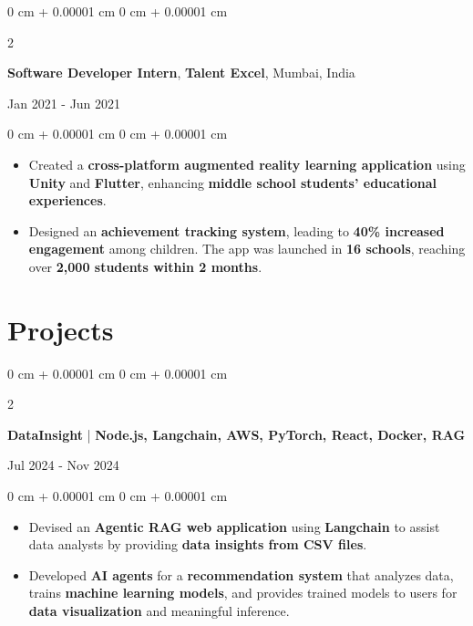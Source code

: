 \documentclass[10pt, letterpaper]{article}
\newenvironment{highlights}{
    \begin{itemize}[
        topsep=0.10 cm,
        parsep=0.10 cm,
        partopsep=0pt,
        itemsep=0pt,
        leftmargin=0 cm + 10pt
    ]
}{
    \end{itemize}
} %
\newenvironment{onecolentry}{
    \begin{adjustwidth}{
        0 cm + 0.00001 cm
    }{
        0 cm + 0.00001 cm
    }
}{
    \end{adjustwidth}
} %
\newenvironment{twocolentry}[2][]{
    \onecolentry
    \def\secondColumn{#2}
    \setcolumnwidth{\fill, 4.5 cm}
    \begin{paracol}{2}
}{
    \switchcolumn \raggedleft \secondColumn
    \end{paracol}
    \endonecolentry
} %
\begin{document}
    

    \vspace{0.10 cm}
    \begin{twocolentry}{
        Jan 2021 - Jun 2021
    }
        \textbf{Software Developer Intern}, \textbf{Talent Excel}, Mumbai, India
    \end{twocolentry}
    
    \begin{onecolentry}
        \begin{highlights}
            \item Created a \textbf{cross-platform augmented reality learning application} using \textbf{Unity} and \textbf{Flutter}, enhancing \textbf{middle school students’ educational experiences}.
            \item Designed an \textbf{achievement tracking system}, leading to \textbf{40\% increased engagement} among children. The app was launched in \textbf{16 schools}, reaching over \textbf{2,000 students within 2 months}.
        \end{highlights}
    \end{onecolentry}
    
    

        \vspace{0.2 cm}

        
        \section{Projects}

        \begin{twocolentry}{
            Jul 2024 - Nov 2024
        }
            \textbf{DataInsight} | \textbf{Node.js, Langchain, AWS, PyTorch, React, Docker, RAG}
        \end{twocolentry}
        \begin{onecolentry}
            \begin{highlights}
                \item Devised an \textbf{Agentic RAG web application} using \textbf{Langchain} to assist data analysts by providing \textbf{data insights from CSV files}.
                \item Developed \textbf{AI agents} for a \textbf{recommendation system} that analyzes data, trains \textbf{machine learning models}, and provides trained models to users for \textbf{data visualization} and meaningful inference.
            \end{highlights}
        \end{onecolentry}
        
\end{document}
